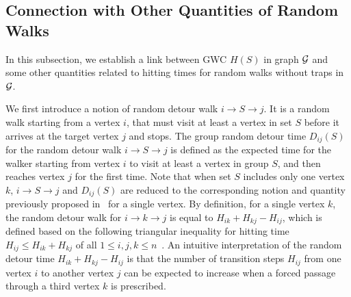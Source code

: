 \documentclass[10pt,twocolumn,twoside]{IEEEtran}
\begin{document}

\subsection{Connection with Other Quantities of Random Walks}




In this subsection, we establish a link between GWC $H(S)$  in graph \(\mathcal{G}\) and some other quantities related to hitting times for random walks without traps in \(\mathcal{G}\).

We first introduce a notion of random detour walk $i\rightarrow S \rightarrow j$. It is a random walk starting from a vertex $i$, that must visit at least a vertex in set $S$ before it arrives at the target vertex $j$ and stops. The group random detour time  \(D_{ij}(S)\) for the random detour walk $i\rightarrow S \rightarrow j$ is defined as the expected time for the walker starting from vertex \(i\) to visit at least a vertex in group \(S\), and then reaches vertex \(j\) for the first time. Note that when set $S$ includes only one vertex $k$, $i\rightarrow S \rightarrow j$ and \(D_{ij}(S)\) are reduced to the corresponding notion and quantity previously proposed in~\cite{RaZh13,BoRaZh11} for a single vertex. By definition, for a single vertex $k$, the random detour walk for $i\rightarrow k \rightarrow j$ is equal to $H_{ik}+ H_{kj} - H_{ij} $, which is defined based on the following triangular inequality  for hitting time $ H_{ij} \leq H_{ik}+ H_{kj}$ of all $1 \leq i,j,k \leq n$~\cite{Hu05}.  An intuitive interpretation of the random detour time $H_{ik}+ H_{kj} - H_{ij}$ is that the number of transition steps $H_{ij}$
from one vertex $i$ to another vertex $j$ can be expected to increase when a forced passage through a third vertex $k$ is prescribed.
\end{document}
